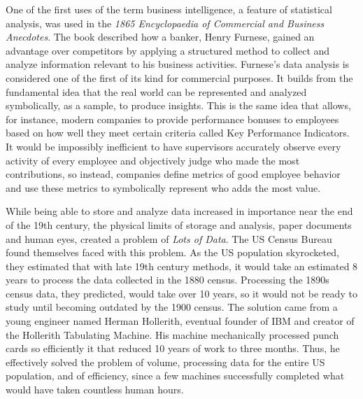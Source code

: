\documentclass[sigconf]{acmart}
\begin{document}
	One of the first uses of the term business intelligence, a feature of statistical analysis, was used in the {\em 1865 Encyclopaedia of Commercial and Business Anecdotes}. The book described how a banker, Henry Furnese, gained an advantage over competitors by applying a structured method to collect and analyze information relevant to his business activities. Furnese's data analysis is considered one of the first of its kind for commercial purposes. It builds from the fundamental idea that the real world can be represented and analyzed symbolically, as a sample, to produce insights.\cite{Data_History} This is the same idea that allows, for instance, modern companies to provide performance bonuses to employees based on how well they meet certain criteria called Key Performance Indicators. It would be impossibly inefficient to have supervisors accurately observe every activity of every employee and objectively judge who made the most contributions, so instead, companies define metrics of good employee behavior and use these metrics to symbolically represent who adds the most value.

	While being able to store and analyze data increased in importance near the end of the 19th century, the physical limits of storage and analysis, paper documents and human eyes, created a problem of {\em Lots of Data}. The US Census Bureau found themselves faced with this problem. As the US population skyrocketed, they estimated that with late 19th century methods, it would take an estimated 8 years to process the data collected in the 1880 census. Processing the 1890s census data, they predicted, would take over 10 years, so it would not be ready to study until becoming outdated by the 1900 census. The solution came from a young engineer named Herman Hollerith, eventual founder of IBM and creator of the Hollerith Tabulating Machine. His machine mechanically processed punch cards so efficiently it that reduced 10 years of work to three months.\cite{Data_History} Thus, he effectively solved the problem of volume, processing data for the entire US population, and of efficiency, since a few machines successfully completed what would have taken countless human hours.
\end{document}
